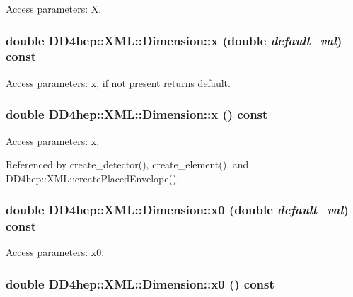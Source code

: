 Access parameters: X. \hypertarget{struct_d_d4hep_1_1_x_m_l_1_1_dimension_ac383e56cd14f770e71e25258e1f32343}{
\subsubsection[{x}]{\setlength{\rightskip}{0pt plus 5cm}double DD4hep::XML::Dimension::x (double {\em default\_\-val}) const}}
\label{struct_d_d4hep_1_1_x_m_l_1_1_dimension_ac383e56cd14f770e71e25258e1f32343}


Access parameters: x, if not present returns default. \hypertarget{struct_d_d4hep_1_1_x_m_l_1_1_dimension_a59bb1c7e352d8ca8bc797f1843153cad}{
\subsubsection[{x}]{\setlength{\rightskip}{0pt plus 5cm}double DD4hep::XML::Dimension::x () const}}
\label{struct_d_d4hep_1_1_x_m_l_1_1_dimension_a59bb1c7e352d8ca8bc797f1843153cad}


Access parameters: x. 

Referenced by create\_\-detector(), create\_\-element(), and DD4hep::XML::createPlacedEnvelope().\hypertarget{struct_d_d4hep_1_1_x_m_l_1_1_dimension_abb8c3f1185f84d41aa23b2650723290e}{
\subsubsection[{x0}]{\setlength{\rightskip}{0pt plus 5cm}double DD4hep::XML::Dimension::x0 (double {\em default\_\-val}) const}}
\label{struct_d_d4hep_1_1_x_m_l_1_1_dimension_abb8c3f1185f84d41aa23b2650723290e}


Access parameters: x0. \hypertarget{struct_d_d4hep_1_1_x_m_l_1_1_dimension_a6d683ef00556655f120526b2ed32b805}{
\subsubsection[{x0}]{\setlength{\rightskip}{0pt plus 5cm}double DD4hep::XML::Dimension::x0 () const}}
\label{struct_d_d4hep_1_1_x_m_l_1_1_dimension_a6d683ef00556655f120526b2ed32b805}


